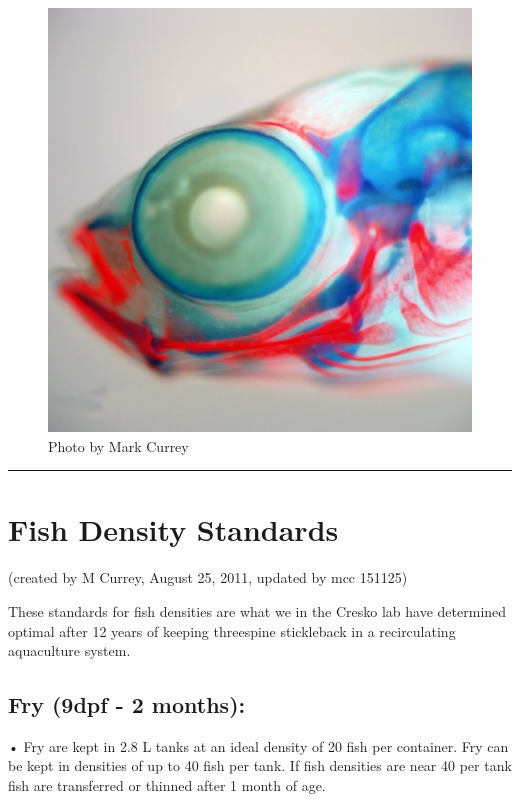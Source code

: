 \documentclass[
]{book}
\begin{document}
\begin{figure}
\centering
\includegraphics{images/double_head.jpg}
\caption{Photo by Mark Currey}
\end{figure}

\begin{center}\rule{0.5\linewidth}{0.5pt}\end{center}

\hypertarget{fish-density-standards}{%
\section{Fish Density Standards}\label{fish-density-standards}}

(created by M Currey, August 25, 2011, updated by mcc 151125)

These standards for fish densities are what we in the Cresko lab have determined optimal after 12 years of keeping threespine stickleback in a recirculating aquaculture system.

\hypertarget{fry-9dpf---2-months}{%
\subsection{Fry (9dpf - 2 months):}\label{fry-9dpf---2-months}}

• Fry are kept in 2.8 L tanks at an ideal density of 20 fish per container. Fry can be kept in densities of up to 40 fish per tank. If fish densities are near 40 per tank fish are transferred or thinned after 1 month of age.
\end{document}
